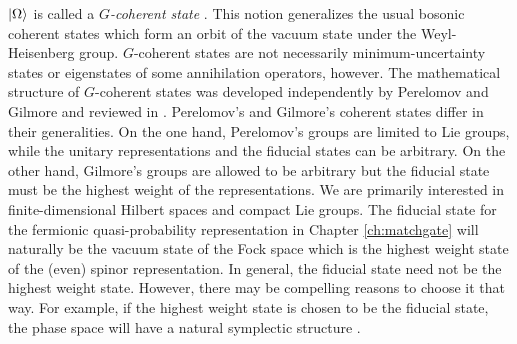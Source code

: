 ${\left\vert{\Omega}\right\rangle}$ is called a \emph{$G$-coherent state}  \cite{perelomov_generalized_1986,combescure2012coherent,ali2014coherent}. This notion generalizes the usual bosonic coherent states which form an orbit of the vacuum state under the Weyl-Heisenberg group. $G$-coherent states are not necessarily minimum-uncertainty states or eigenstates of some annihilation operators, however. The mathematical structure of $G$-coherent states was developed independently by Perelomov \cite{perelomov_coherent_1972} and Gilmore \cite{gilmore_geometry_1972,gilmore1974properties} and reviewed in \cite{zhang_coherent_1990}. Perelomov's and Gilmore's coherent states differ in their generalities. On the one hand, Perelomov's groups are limited to Lie groups, while the unitary representations and the fiducial states can be arbitrary. On the other hand, Gilmore's groups are allowed to be arbitrary but the fiducial state must be the highest weight of the representations. We are primarily interested in finite-dimensional Hilbert spaces and compact Lie groups. The fiducial state for the fermionic quasi-probability representation in Chapter \ref{ch:matchgate} will naturally be the vacuum state of the Fock space which is the highest weight state of the (even) spinor representation. In general, the fiducial state need not be the highest weight state. However, there may be compelling reasons to choose it that way. For example, if the highest weight state is chosen to be the fiducial state, the phase space will have a natural symplectic structure \cite{onofri_note_1975}.

